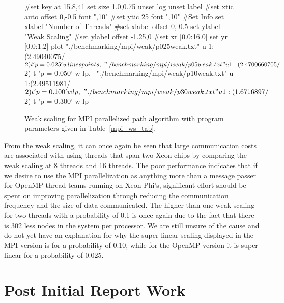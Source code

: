 \documentclass[11pt]{article}
\begin{document}
\begin{figure}[h]
	\begin{center}
		\begin{gnuplot}[terminal=cairolatex, terminaloptions= color] 
			#set key at 15.8,41
			set size 1.0,0.75              
			unset log                          
			unset label                          
			#set xtic auto offset 0,-0.5 font ",10"                     
			#set ytic 25 font ",10" 
			#Set Info
			set xlabel "Number of Threads"
			#set xlabel offset 0,-0.5
			set ylabel "Weak Scaling"
			#set ylabel offset -1.25,0
			#set xr [0.0:16.0]
			set yr [0.0:1.2]
			plot "./benchmarking/mpi/weak/p025weak.txt" u 1:(2.49040075/$2) t 'p = 0.025' w linespoints, \
			"./benchmarking/mpi/weak/p05weak.txt" u 1:(2.4700660705/$2) t 'p = 0.050' w lp, \
			"./benchmarking/mpi/weak/p10weak.txt" u 1:(2.49511981/$2) t 'p = 0.100' w lp, \
			"./benchmarking/mpi/weak/p30weak.txt" u 1:(1.6716897/$2) t 'p = 0.300' w lp
		\end{gnuplot}
		\caption{Weak scaling for MPI parallelized path algorithm with program parameters given in Table~\ref{mpi_ws_tab}.}
		\label{mpi_ws}
	\end{center}
\end{figure}
\noindent From the weak scaling, it can once again be seen that large communication costs are associated with using threads that span two Xeon chips by comparing the weak scaling at 8 threads and 16 threads. The poor performance indicates that if we desire to use the MPI parallelization as anything more than a message passer for OpenMP thread teams running on Xeon Phi's, significant effort should be spent on improving parallelization through reducing the communication frequency and the size of data communicated. The higher than one weak scaling for two threads with a probability of 0.1 is once again due to the fact that there is 302 less nodes in the system per processor. We are still unsure of the cause and do not yet have an explanation for why the super-linear scaling displayed in the MPI version is for a probability of 0.10, while for the OpenMP version it is super-linear for a probability of 0.025.  

\section{Post Initial Report Work}
\end{document}
